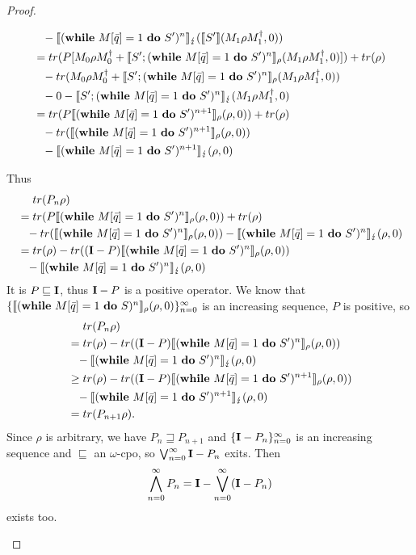 \documentclass[a4paper,UKenglish,cleveref, autoref, thm-restate]{lipics-v2021}
\begin{document}
\begin{proof}
\begin{itemize}
\begin{itemize}
\begin{align*}
                &\phantom{=}- \semanticsErr{(\while')^{n}}(\semantics{S'}(M_1\rho M_1^\dagger,0))\\
                &= tr(P[M_0 \rho M_0^\dagger + \semanticsRho{S';(\while')^n}(M_1 \rho M_1^\dagger,0)])+ tr(\rho)\\
                &\phantom{=}-tr(M_0 \rho M_0^\dagger + \semanticsRho{S';(\while')^n}(M_1 \rho M_1^\dagger,0))\\
                & \phantom{=}- 0 -\semanticsErr{S';(\while')^{n}}(M_1\rho M_1^\dagger,0)\\
                &= tr(P \semanticsRho{(\while')^{n+1}}(\rho,0))+ tr(\rho)\\
                &\phantom{=}-tr(\semanticsRho{(\while')^{n+1}}(\rho,0))\\
                &\phantom{=}- \semanticsErr{(\while')^{n+1}}(\rho,0)
            \end{align*}
        \end{itemize}
        Thus
        \begin{align*}
            &\phantom{=.}tr(P_n \rho)\\
            &= tr(P \semanticsRho{(\while')^n}(\rho,0))+ tr(\rho)\\
            &\phantom{=}-tr(\semanticsRho{(\while')^n}(\rho,0))- \semanticsErr{(\while')^n}(\rho,0)\\
            &= tr(\rho)- tr((\identityOp-P)\semanticsRho{(\while')^n}(\rho,0)) \\
            &\phantom{=}- \semanticsErr{(\while')^n}(\rho,0)
        \end{align*}
        It is $P \sqsubseteq \identityOp$, thus $\identityOp-P$ is a positive operator.
        We know that $\{\semanticsRho{(\while)^{n}}(\rho,0)\}_{n=0}^\infty$ is an increasing sequence, $P$ is positive, so
        \begin{align*}
            &\phantom{=.}tr(P_n \rho) \\
            &= tr(\rho)- tr((\identityOp-P)\semanticsRho{(\while')^n}(\rho,0)) \\
            &\phantom{=}- \semanticsErr{(\while')^n}(\rho,0)\\
            &\geq  tr(\rho)- tr((\identityOp-P)\semanticsRho{(\while')^{n+1}}(\rho,0)) \\
            &\phantom{=}- \semanticsErr{(\while')^{n+1}}(\rho,0)\\
            &= tr(P_{n+1}\rho).
        \end{align*}
        Since $\rho$ is arbitrary, we have $P_n \sqsupseteq P_{n+1}$ and $\{\identityOp-P_n\}_{n=0}^\infty$ is an increasing sequence and $\sqsubseteq$ an $\omega$-cpo, so $\bigvee_{n=0}^\infty \identityOp-P_n$ exits. Then
        \begin{equation*}
            \bigwedge_{n=0}^\infty P_n = \identityOp - \bigvee_{n=0}^\infty (\identityOp-P_n)
        \end{equation*}
        exists too.


\end{itemize}
\end{proof}
\end{document}
